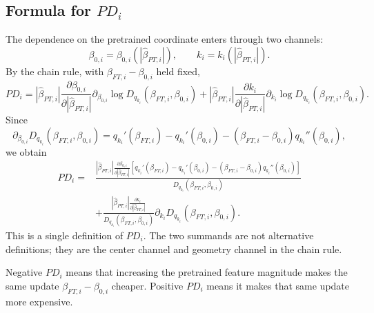 \documentclass[11pt]{article}
\begin{document}
\subsection{Formula for \texorpdfstring{\(PD_i\)}{PD-i}}

The dependence on the pretrained coordinate enters through two channels:
\begin{equation}
    \beta_{0,i}=\beta_{0,i}(|\widehat\beta_{PT,i}|),
    \qquad
    k_i=k_i(|\widehat\beta_{PT,i}|).
\end{equation}
By the chain rule, with \(\beta_{FT,i}-\beta_{0,i}\) held fixed,
\begin{equation}
    PD_i
    =
    |\widehat\beta_{PT,i}|
    \frac{\partial\beta_{0,i}}{\partial |\widehat\beta_{PT,i}|}
    \partial_{\beta_{0,i}}\log D_{q_{k_i}}(\beta_{FT,i},\beta_{0,i})
    +
    |\widehat\beta_{PT,i}|
    \frac{\partial k_i}{\partial |\widehat\beta_{PT,i}|}
    \partial_{k_i}\log D_{q_{k_i}}(\beta_{FT,i},\beta_{0,i}).
\end{equation}
Since
\begin{equation}
    \partial_{\beta_{0,i}}D_{q_{k_i}}(\beta_{FT,i},\beta_{0,i})
    =
    q_{k_i}'(\beta_{FT,i})
    -
    q_{k_i}'(\beta_{0,i})
    -
    (\beta_{FT,i}-\beta_{0,i})q_{k_i}''(\beta_{0,i}),
\end{equation}
we obtain
\begin{equation}
    \boxed{
    \begin{aligned}
    PD_i
    ={}&
    \frac{
    |\widehat\beta_{PT,i}|
    \frac{\partial\beta_{0,i}}{\partial |\widehat\beta_{PT,i}|}
    \left[
    q_{k_i}'(\beta_{FT,i})-q_{k_i}'(\beta_{0,i})
    -
    (\beta_{FT,i}-\beta_{0,i})q_{k_i}''(\beta_{0,i})
    \right]
    }{
    D_{q_{k_i}}(\beta_{FT,i},\beta_{0,i})
    }\\
    &+
    \frac{
    |\widehat\beta_{PT,i}|
    \frac{\partial k_i}{\partial |\widehat\beta_{PT,i}|}
    }{
    D_{q_{k_i}}(\beta_{FT,i},\beta_{0,i})
    }
    \partial_{k_i}D_{q_{k_i}}(\beta_{FT,i},\beta_{0,i}).
    \end{aligned}
    }
\end{equation}
This is a single definition of \(PD_i\). The two summands are not alternative definitions; they are the center channel and geometry channel in the chain rule.

Negative \(PD_i\) means that increasing the pretrained feature magnitude makes the same update \(\beta_{FT,i}-\beta_{0,i}\) cheaper. Positive \(PD_i\) means it makes that same update more expensive.
\end{document}
